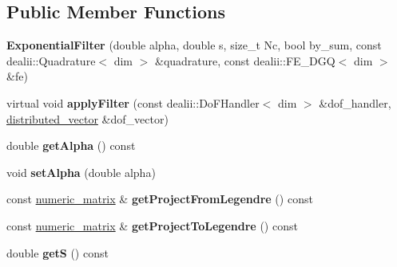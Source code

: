 \subsection*{Public Member Functions}
\begin{DoxyCompactItemize}
\item 
\hypertarget{classnatrium_1_1ExponentialFilter_ab5d0220e085670947206872d04ce650e}{
{\bfseries ExponentialFilter} (double alpha, double s, size\_\-t Nc, bool by\_\-sum, const dealii::Quadrature$<$ dim $>$ \&quadrature, const dealii::FE\_\-DGQ$<$ dim $>$ \&fe)}
\label{classnatrium_1_1ExponentialFilter_ab5d0220e085670947206872d04ce650e}

\item 
\hypertarget{classnatrium_1_1ExponentialFilter_accc2cb39244329cf08fd9a8ce6f4967d}{
virtual void {\bfseries applyFilter} (const dealii::DoFHandler$<$ dim $>$ \&dof\_\-handler, \hyperlink{namespacenatrium_a903d2b92917f582f2ff05f52160ab811}{distributed\_\-vector} \&dof\_\-vector)}
\label{classnatrium_1_1ExponentialFilter_accc2cb39244329cf08fd9a8ce6f4967d}

\item 
\hypertarget{classnatrium_1_1ExponentialFilter_a4916e533bd21556c111cadb41a62150d}{
double {\bfseries getAlpha} () const }
\label{classnatrium_1_1ExponentialFilter_a4916e533bd21556c111cadb41a62150d}

\item 
\hypertarget{classnatrium_1_1ExponentialFilter_ae3da30faa73264b0b4b77eaf1f997a76}{
void {\bfseries setAlpha} (double alpha)}
\label{classnatrium_1_1ExponentialFilter_ae3da30faa73264b0b4b77eaf1f997a76}

\item 
\hypertarget{classnatrium_1_1ExponentialFilter_a728ae9decf2609a692177c4236d3efbc}{
const \hyperlink{namespacenatrium_ad8cbec7aab93a74837b06ded39615d47}{numeric\_\-matrix} \& {\bfseries getProjectFromLegendre} () const }
\label{classnatrium_1_1ExponentialFilter_a728ae9decf2609a692177c4236d3efbc}

\item 
\hypertarget{classnatrium_1_1ExponentialFilter_a575257170aeddb2b18287e54c6a9d39d}{
const \hyperlink{namespacenatrium_ad8cbec7aab93a74837b06ded39615d47}{numeric\_\-matrix} \& {\bfseries getProjectToLegendre} () const }
\label{classnatrium_1_1ExponentialFilter_a575257170aeddb2b18287e54c6a9d39d}

\item 
\hypertarget{classnatrium_1_1ExponentialFilter_a9f275d8ce24b68f8a9bf99256e5ef3ba}{
double {\bfseries getS} () const }
\label{classnatrium_1_1ExponentialFilter_a9f275d8ce24b68f8a9bf99256e5ef3ba}


\end{DoxyCompactItemize}
